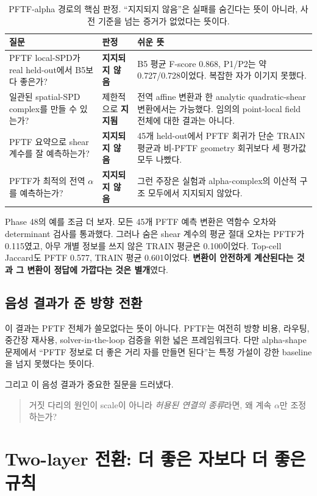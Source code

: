 \documentclass[11pt,a4paper]{article}
\newcommand{\yes}{\textcolor{deepblue}{\textbf{지지됨}}}
\newcommand{\no}{\textcolor{red!65!black}{\textbf{지지되지 않음}}}
\begin{document}
\begin{table}[tbp]
\centering
\caption{PFTF-alpha 경로의 핵심 판정. ``지지되지 않음''은 실패를 숨긴다는 뜻이
아니라, 사전 기준을 넘는 증거가 없었다는 뜻이다.}
\small
\begin{tabularx}{\textwidth}{p{}p{}X}
\toprule
질문 & 판정 & 쉬운 뜻 \\
\midrule
PFTF local-SPD가 real held-out에서 B5보다 좋은가? & \no &
B5 평균 F-score 0.868, P1/P2는 약 0.727/0.728이었다. 복잡한 자가 이기지 못했다. \\
일관된 spatial-SPD complex를 만들 수 있는가? & 제한적으로 \yes &
전역 affine 변환과 한 analytic quadratic-shear 변환에서는 가능했다. 임의의
point-local field 전체에 대한 결과는 아니다. \\
PFTF 요약으로 shear 계수를 잘 예측하는가? & \no &
45개 held-out에서 PFTF 회귀가 단순 TRAIN 평균과 비-PFTF geometry 회귀보다
세 평가값 모두 나빴다. \\
PFTF가 최적의 전역 $\alpha$를 예측하는가? & \no &
그런 주장은 실험과 alpha-complex의 이산적 구조 모두에서 지지되지 않았다. \\
\bottomrule
\end{tabularx}
\end{table}

Phase 48의 예를 조금 더 보자. 모든 45개 PFTF 예측 변환은 역함수 오차와 determinant
검사를 통과했다. 그러나 숨은 shear 계수의 평균 절대 오차는 PFTF가 0.115였고,
아무 개별 정보를 쓰지 않은 TRAIN 평균은 0.100이었다. Top-cell Jaccard도 PFTF
0.577, TRAIN 평균 0.601이었다. \textbf{변환이 안전하게 계산된다는 것과 그 변환이
정답에 가깝다는 것은 별개}였다.

\subsection{음성 결과가 준 방향 전환}

이 결과는 PFTF 전체가 쓸모없다는 뜻이 아니다. PFTF는 여전히 방향 비용, 라우팅,
중간장 재사용, solver-in-the-loop 검증을 위한 넓은 프레임워크다. 다만 alpha-shape
문제에서 ``PFTF 정보로 더 좋은 거리 자를 만들면 된다''는 특정 가설이 강한
baseline을 넘지 못했다는 뜻이다.

그리고 이 음성 결과가 중요한 질문을 드러냈다.

\begin{quote}
거짓 다리의 원인이 scale이 아니라 \emph{허용된 연결의 종류}라면,
왜 계속 $\alpha$만 조정하는가?
\end{quote}

\section{Two-layer 전환: 더 좋은 자보다 더 좋은 규칙}
\end{document}
